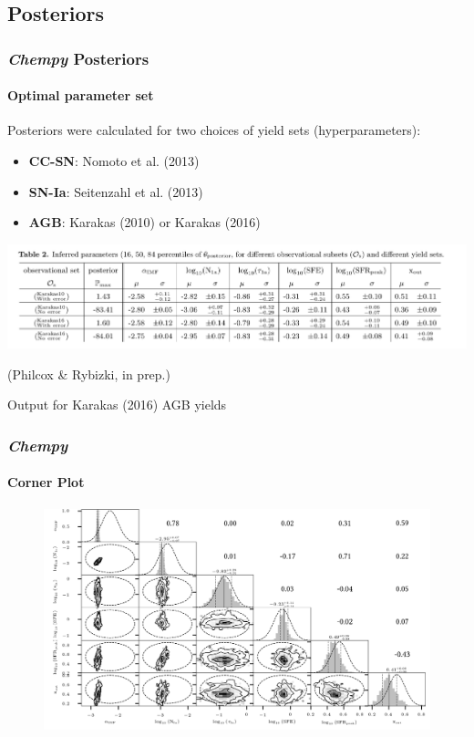 \documentclass{beamer}
\begin{document}
\subsection{Posteriors}
\begin{frame}
\frametitle{\textit{Chempy} Posteriors}
\framesubtitle{Optimal parameter set}
Posteriors were calculated for two choices of yield sets (hyperparameters):
\begin{itemize}
\item  \textbf{CC-SN}: Nomoto et al. (2013)
\item \textbf{ SN-Ia}:  Seitenzahl et al. (2013) 
\item \textbf{AGB}: Karakas (2010) or Karakas (2016)
\vfill
\end{itemize}
\includegraphics[width=\textwidth]{ChempyPosterior.png}

\tiny (Philcox \& Rybizki, in prep.)
\end{frame}

\begin{frame}
Output for Karakas (2016) AGB yields
\frametitle{\textit{Chempy}}
\framesubtitle{Corner Plot}
\begin{figure}
\centering
\includegraphics[width=\textwidth]{Karakas16ZeroError.png}
\end{figure}
\end{frame}
\end{document}
